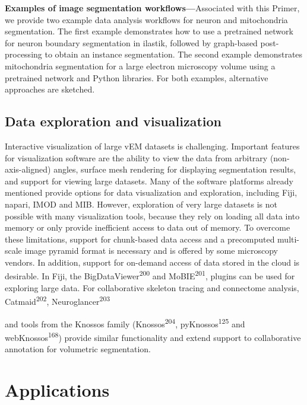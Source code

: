 \documentclass{article}
\begin{document}
\textbf{Examples of image segmentation workflows—}Associated with this Primer, we provide two example data analysis workflows for neuron and mitochondria segmentation. The first example demonstrates how to use a pretrained network for neuron boundary segmentation in ilastik, followed by graph-based post-processing to obtain an instance segmentation. The second example demonstrates mitochondria segmentation for a large electron microscopy volume using a pretrained network and Python libraries. For both examples, alternative approaches are sketched.


\subsection*{Data exploration and visualization}

Interactive visualization of large vEM datasets is challenging. Important features for visualization software are the ability to view the data from arbitrary (non-axis-aligned) angles, surface mesh rendering for displaying segmentation results, and support for viewing large datasets. Many of the software platforms already mentioned provide options for data visualization and exploration, including Fiji, napari, IMOD and MIB. However, exploration of very large datasets is not possible with many visualization tools, because they rely on loading all data into memory or only provide inefficient access to data out of memory. To overcome these limitations, support for chunk-based data access and a precomputed multi-scale image pyramid format is necessary and is offered by some microscopy vendors. In addition, support for on-demand access of data stored in the cloud is desirable. In Fiji, the BigDataViewer\textsuperscript{200} and MoBIE\textsuperscript{201}, plugins can be used for exploring large data. For collaborative skeleton tracing and connectome analysis, Catmaid\textsuperscript{202}, Neuroglancer\textsuperscript{203}

and tools from the Knossos family (Knossos\textsuperscript{204}, pyKnossos\textsuperscript{125} and webKnossos\textsuperscript{168}) provide similar functionality and extend support to collaborative annotation for volumetric segmentation.

\section*{Applications}
\end{document}
